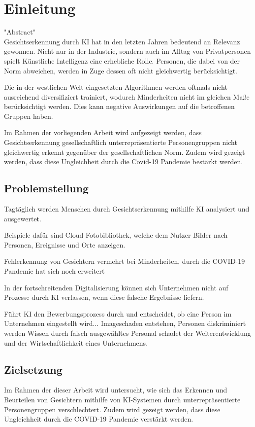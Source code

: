 \section{Einleitung}
"Abstract"\\
Gesichtserkennung durch \ac{KI} hat in den letzten Jahren bedeutend an Relevanz gewonnen. Nicht nur in der Industrie, sondern auch im Alltag von Privatpersonen spielt Künstliche Intelligenz eine erhebliche Rolle. Personen, die dabei von der Norm abweichen, werden in Zuge dessen oft nicht gleichwertig berücksichtigt. 

Die in der westlichen Welt eingesetzten Algorithmen werden oftmals nicht ausreichend diversifiziert  trainiert, wodurch Minderheiten nicht im gleichen Maße berücksichtigt werden. Dies kann negative Auswirkungen auf die betroffenen Gruppen haben.

Im Rahmen der vorliegenden Arbeit wird aufgezeigt werden, dass Gesichtserkennung gesellschaftlich unterrepräsentierte Personengruppen nicht gleichwertig erkennt gegenüber der gesellschaftlichen Norm. Zudem wird gezeigt werden, dass diese Ungleichheit durch die Covid-19 Pandemie bestärkt werden.

\subsection{Problemstellung}
Tagtäglich werden Menschen durch Gesichtserkennung mithilfe \ac{KI} analysiert und ausgewertet.

Beispiele dafür sind Cloud Fotobibliothek, welche dem Nutzer Bilder nach Personen, Ereignisse und Orte anzeigen. 

Fehlerkennung von Gesichtern vermehrt bei Minderheiten, 
durch die COVID-19 Pandemie hat sich noch erweitert

In der fortschreitenden Digitalisierung können sich Unternehmen nicht auf Prozesse durch \ac{KI} verlassen, wenn diese falsche Ergebnisse liefern. 

Führt \ac{KI} den Bewerbungsprozess durch und entscheidet, ob eine Person im Unternehmen eingestellt wird...
Imageschaden entstehen, Personen diskriminiert werden 
Wissen durch falsch ausgewähltes Personal schadet der Weiterentwicklung und der Wirtschaftlichkeit eines Unternehmens. 

\subsection{Zielsetzung}
Im Rahmen der dieser Arbeit wird untersucht, wie sich das Erkennen und Beurteilen von Gesichtern mithilfe von KI-Systemen durch unterrepräsentierte Personengruppen verschlechtert. 
Zudem wird gezeigt werden, dass diese Ungleichheit durch die COVID-19 Pandemie verstärkt werden.

